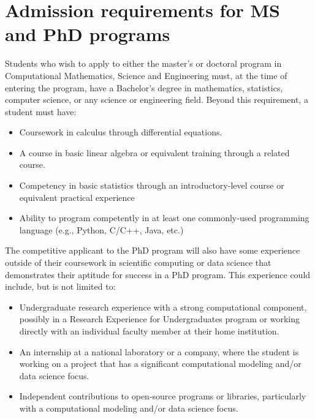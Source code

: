 \section{Admission requirements for MS and PhD programs}
\label{sec:grad_admission}

Students who wish to apply to either the master's or doctoral program in Computational
Mathematics, Science and Engineering must, at the time of entering
the program, have a Bachelor's degree in mathematics, statistics,
computer science, or any science or engineering field.  Beyond this
requirement, a student must have:

\begin{itemize}
\item Coursework in calculus through differential equations.

\item A course in basic linear algebra or equivalent training through
  a related course.

\item Competency in basic statistics through an introductory-level
  course or equivalent practical
  experience

\item Ability to program competently in at least one commonly-used programming language
  (e.g., Python, C/C++, Java, etc.)

\end{itemize}

The competitive applicant to the PhD program will also have some experience outside of
their coursework in scientific computing or data science that
demonstrates their aptitude for success in a PhD program.  This
experience could include, but is not limited to:  

\begin{itemize}
\item Undergraduate research experience with a strong computational
  component, possibly in a Research Experience for Undergraduates program or working directly with an
  individual faculty member at their home institution.

\item An internship at a national laboratory or a company, where the
  student is working on a
  project that has a significant computational modeling and/or data
  science focus.

\item Independent contributions to open-source programs or libraries,
  particularly with a computational modeling and/or data science
  focus.
\end{itemize}


